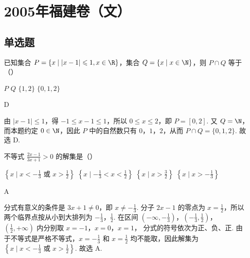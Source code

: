 \chapter{2005年福建卷（文）}
\section{单选题}
\begin{problem}
已知集合 \(P = \{x \mid |x - 1| \leqslant 1, x \in \R\}\)，集合 \(Q = \{x \mid x \in \N\}\)，则 \(P \cap Q\) 等于（\quad）

\choices
    {\(P\)}
    {\(Q\)}
    {\(\{1,2\}\)}
    {\(\{0,1,2\}\)}
\end{problem}

\begin{answer}
D
\end{answer}

\begin{solution}
由 \(\lvert x-1\rvert\leqslant1\)，得
\(-1\leqslant x-1\leqslant1\)，所以 \(0\leqslant x\leqslant2\)，即
\(P=[0,2]\). 又 \(Q=\N\)，而本题约定 \(0\in\N\)，因此 \(P\) 中的自然数只有
\(0\)，\(1\)，\(2\)，从而 \(P\cap Q=\{0,1,2\}\). 故选 D.
\end{solution}

\begin{problem}
不等式 \(\frac{2x - 1}{3x + 1} > 0\) 的解集是（\quad）

\choices
    {\(\left\{x\mid x < - \frac{1}{3}\text{\ 或\ } x > \frac{1}{2}\right\}\)}
    {\(\left\{x\mid -\frac{1}{3} < x < \frac{1}{2}\right\}\)}
    {\(\left\{x\mid x > \frac{3}{2}\right\}\)}
    {\(\left\{x\mid x > -\frac{1}{3}\right\}\)}
\end{problem}

\begin{answer}
A
\end{answer}

\begin{solution}
分式有意义的条件是 \(3x+1\neq0\)，即 \(x\neq-\frac{1}{3}\). 分子
\(2x-1\) 的零点为 \(x=\frac{1}{2}\)，所以两个临界点按从小到大排列为
\(-\frac{1}{3}\)，\(\frac{1}{2}\). 在区间
\(\left(-\infty,-\frac{1}{3}\right)\)，\(\left(-\frac{1}{3},\frac{1}{2}\right)\)，
\(\left(\frac{1}{2},+\infty\right)\) 内分别取 \(x=-1\)，\(x=0\)，\(x=1\)，
分式的符号依次为正、负、正. 由于不等式是严格不等式，\(x=-\frac{1}{3}\)
和 \(x=\frac{1}{2}\) 均不能取，因此解集为
\(\left\{x\mid x< -\frac{1}{3}\text{ 或 }x>\frac{1}{2}\right\}\). 故选 A.
\end{solution}

